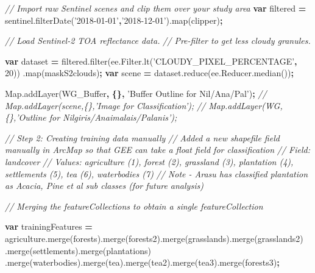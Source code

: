 \documentclass[]{article}
\newenvironment{Shaded}{\begin{snugshade}}{\end{snugshade}}
\newcommand{\AttributeTok}[1]{\textcolor[rgb]{0.77,0.63,0.00}{#1}}
\newcommand{\CommentTok}[1]{\textcolor[rgb]{0.56,0.35,0.01}{\textit{#1}}}
\newcommand{\DecValTok}[1]{\textcolor[rgb]{0.00,0.00,0.81}{#1}}
\newcommand{\KeywordTok}[1]{\textcolor[rgb]{0.13,0.29,0.53}{\textbf{#1}}}
\newcommand{\NormalTok}[1]{#1}
\newcommand{\OperatorTok}[1]{\textcolor[rgb]{0.81,0.36,0.00}{\textbf{#1}}}
\newcommand{\StringTok}[1]{\textcolor[rgb]{0.31,0.60,0.02}{#1}}
\newcommand{\VariableTok}[1]{\textcolor[rgb]{0.00,0.00,0.00}{#1}}
\begin{document}
\begin{Shaded}
\begin{Highlighting}[numbers=left,,]
\CommentTok{// Import raw Sentinel scenes and clip them over your study area}
\KeywordTok{var}\NormalTok{ filtered }\OperatorTok{=} \VariableTok{sentinel}\NormalTok{.}\AttributeTok{filterDate}\NormalTok{(}\StringTok{'2018-01-01'}\OperatorTok{,}\StringTok{'2018-12-01'}\NormalTok{).}\AttributeTok{map}\NormalTok{(clipper)}\OperatorTok{;}

\CommentTok{// Load Sentinel-2 TOA reflectance data.}
\CommentTok{// Pre-filter to get less cloudy granules.}

\KeywordTok{var}\NormalTok{ dataset }\OperatorTok{=} \VariableTok{filtered}\NormalTok{.}\AttributeTok{filter}\NormalTok{(}\VariableTok{ee}\NormalTok{.}\VariableTok{Filter}\NormalTok{.}\AttributeTok{lt}\NormalTok{(}\StringTok{'CLOUDY_PIXEL_PERCENTAGE'}\OperatorTok{,} \DecValTok{20}\NormalTok{))}
\NormalTok{                  .}\AttributeTok{map}\NormalTok{(maskS2clouds)}\OperatorTok{;}
\KeywordTok{var}\NormalTok{ scene }\OperatorTok{=} \VariableTok{dataset}\NormalTok{.}\AttributeTok{reduce}\NormalTok{(}\VariableTok{ee}\NormalTok{.}\VariableTok{Reducer}\NormalTok{.}\AttributeTok{median}\NormalTok{())}\OperatorTok{;}

\VariableTok{Map}\NormalTok{.}\AttributeTok{addLayer}\NormalTok{(WG_Buffer}\OperatorTok{,} \OperatorTok{\{\},} \StringTok{'Buffer Outline for Nil/Ana/Pal'}\NormalTok{)}\OperatorTok{;}
\CommentTok{// Map.addLayer(scene,\{\},'Image for Classification');}
\CommentTok{// Map.addLayer(WG, \{\},'Outline for Nilgiris/Anaimalais/Palanis');}


\CommentTok{// Step 2: Creating training data manually}
\CommentTok{// Added a new shapefile field manually in ArcMap so that GEE can take a float field for classification}
\CommentTok{// Field: landcover}
\CommentTok{// Values: agriculture (1), forest (2), grassland (3), plantation (4), settlements (5), tea (6), waterbodies (7)}
\CommentTok{// Note - Arasu has classified plantation as Acacia, Pine et al sub classes (for future analysis)}

\CommentTok{// Merging the featureCollections to obtain a single featureCollection}

\KeywordTok{var}\NormalTok{ trainingFeatures }\OperatorTok{=} \VariableTok{agriculture}\NormalTok{.}\AttributeTok{merge}\NormalTok{(forests).}\AttributeTok{merge}\NormalTok{(forests2).}\AttributeTok{merge}\NormalTok{(grasslands).}\AttributeTok{merge}\NormalTok{(grasslands2)}
\NormalTok{                               .}\AttributeTok{merge}\NormalTok{(settlements).}\AttributeTok{merge}\NormalTok{(plantations)}
\NormalTok{                            .}\AttributeTok{merge}\NormalTok{(waterbodies).}\AttributeTok{merge}\NormalTok{(tea).}\AttributeTok{merge}\NormalTok{(tea2).}\AttributeTok{merge}\NormalTok{(tea3).}\AttributeTok{merge}\NormalTok{(forests3)}\OperatorTok{;}


\end{Highlighting}
\end{Shaded}
\end{document}
